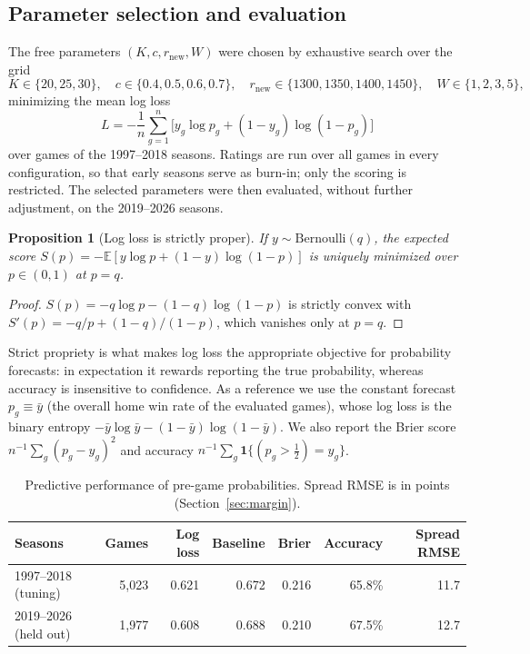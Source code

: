 \documentclass[11pt]{article}
\newcommand{\trainyears}{1997--2018}
\newcommand{\testyears}{2019--2026}
\newcommand{\E}{\mathbb{E}}
\newcommand{\ind}{\mathbf{1}}
\theoremstyle{plain}
\newtheorem{proposition}{Proposition}
\theoremstyle{definition}
\theoremstyle{remark}
\begin{document}
\subsection{Parameter selection and evaluation}\label{sec:fit}

The free parameters $(K, c, r_{\mathrm{new}}, W)$ were chosen by exhaustive search over the grid
\[
  K \in \{20, 25, 30\},\quad c \in \{0.4, 0.5, 0.6, 0.7\},\quad r_{\mathrm{new}} \in \{1300, 1350, 1400, 1450\},\quad W \in \{1, 2, 3, 5\},
\]
minimizing the mean log loss
\begin{equation}\label{eq:logloss}
  L = -\frac{1}{n}\sum_{g=1}^{n} \bigl[y_g \log p_g + (1-y_g)\log(1-p_g)\bigr]
\end{equation}
over games of the \trainyears{} seasons. Ratings are run over all games in every configuration, so that early seasons serve as burn-in; only the scoring is restricted. The selected parameters were then evaluated, without further adjustment, on the \testyears{} seasons.

\begin{proposition}[Log loss is strictly proper]
If $y \sim \mathrm{Bernoulli}(q)$, the expected score $S(p) = -\E[y\log p + (1-y)\log(1-p)]$ is uniquely minimized over $p \in (0,1)$ at $p = q$.
\end{proposition}
\begin{proof}
$S(p) = -q\log p - (1-q)\log(1-p)$ is strictly convex with $S'(p) = -q/p + (1-q)/(1-p)$, which vanishes only at $p = q$.
\end{proof}

Strict propriety \cite{gneiting2007} is what makes log loss the appropriate objective for probability forecasts: in expectation it rewards reporting the true probability, whereas accuracy is insensitive to confidence. As a reference we use the constant forecast $p_g \equiv \bar y$ (the overall home win rate of the evaluated games), whose log loss is the binary entropy $-\bar y\log\bar y - (1-\bar y)\log(1-\bar y)$. We also report the Brier score $n^{-1}\sum_g (p_g - y_g)^2$ and accuracy $n^{-1}\sum_g \ind\{(p_g > \tfrac12) = y_g\}$.

\begin{table}[h]
\centering
\begin{tabular}{lrrrrrr}
\toprule
Seasons & Games & Log loss & Baseline & Brier & Accuracy & Spread RMSE \\
\midrule
\trainyears{} (tuning) & 5{,}023 & 0.621 & 0.672 & 0.216 & 65.8\% & 11.7 \\
\testyears{} (held out) & 1{,}977 & 0.608 & 0.688 & 0.210 & 67.5\% & 12.7 \\
\bottomrule
\end{tabular}
\caption{Predictive performance of pre-game probabilities. Spread RMSE is in points (Section~\ref{sec:margin}).}
\label{tab:backtest}
\end{table}
\end{document}
